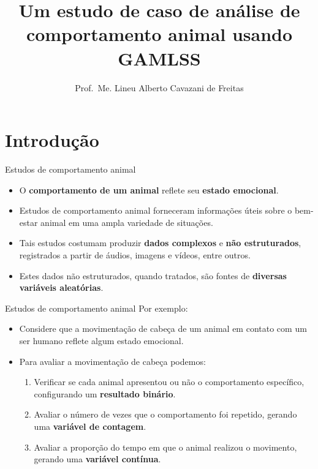 \documentclass[
  ignorenonframetext,
  serif,
  professionalfont,
  usenames,
  dvipsnames,
  aspectratio = 169]{beamer}
\title{\textbf{Um estudo de caso de análise de comportamento animal usando GAMLSS}}
\author{Prof.~Me. Lineu Alberto Cavazani de Freitas}
\date{}
\institute{Departamento de Estatística\\
Laboratório de Estatística e Geoinformação}
\begin{document}
\frame{\titlepage}

\hypertarget{introduuxe7uxe3o}{%
\section{Introdução}\label{introduuxe7uxe3o}}

\begin{frame}{Estudos de comportamento animal}
\protect\hypertarget{estudos-de-comportamento-animal}{}
\begin{itemize}
\item
  O \textbf{comportamento de um animal} reflete seu
  \textbf{estado emocional}.
\item
  Estudos de comportamento animal forneceram informações úteis sobre o
  bem-estar animal em uma ampla variedade de situações.
\item
  Tais estudos costumam produzir \textbf{dados complexos} e
  \textbf{não estruturados}, registrados a partir de áudios, imagens e
  vídeos, entre outros.
\item
  Estes dados não estruturados, quando tratados, são fontes de
  \textbf{diversas variáveis aleatórias}.
\end{itemize}
\end{frame}

\begin{frame}{Estudos de comportamento animal}
\protect\hypertarget{estudos-de-comportamento-animal-1}{}
Por exemplo:

\begin{itemize}
\item
  Considere que a movimentação de cabeça de um animal em contato com um
  ser humano reflete algum estado emocional.
\item
  Para avaliar a movimentação de cabeça podemos:

  \begin{enumerate}
  \item
    Verificar se cada animal apresentou ou não o comportamento
    específico, configurando um \textbf{resultado binário}.
  \item
    Avaliar o número de vezes que o comportamento foi repetido, gerando
    uma \textbf{variável de contagem}.
  \item
    Avaliar a proporção do tempo em que o animal realizou o movimento,
    gerando uma \textbf{variável contínua}.
  \end{enumerate}
\end{itemize}
\end{frame}
\end{document}
